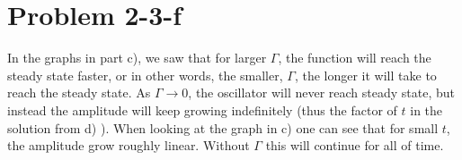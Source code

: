 \section*{Problem 2-3-f}
In the graphs in part c), we saw that for larger $\Gamma$, the function will reach the steady state faster, or in other words, the smaller, $\Gamma$, the longer it will take to reach the steady state. As $\Gamma \to 0$, the oscillator will never reach steady state, but instead the amplitude will keep growing indefinitely (thus the factor of $t$ in the solution from d) ). When looking at the graph in c) one can see that for small $t$, the amplitude grow roughly linear. Without $\Gamma$ this will continue for all of time.
